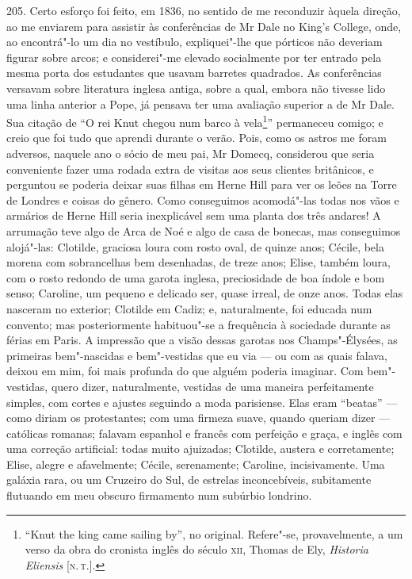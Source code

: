 205. Certo esforço foi feito, em 1836, no sentido de me reconduzir
àquela direção, ao me enviarem para assistir às conferências de Mr Dale
no King's College, onde, ao encontrá"-lo um dia no vestíbulo,
expliquei"-lhe que pórticos não deveriam figurar sobre arcos; e
considerei"-me elevado socialmente por ter entrado pela mesma porta dos
estudantes que usavam barretes quadrados. As conferências versavam sobre
literatura inglesa antiga, sobre a qual, embora não tivesse lido uma
linha anterior a Pope, já pensava ter uma avaliação superior a de Mr
Dale. Sua citação de ``O rei Knut chegou num barco à vela\footnote{``Knut
  the king came sailing by'', no original. Refere"-se, provavelmente, a
  um verso da obra do cronista inglês do século \textsc{xii}, Thomas de Ely,
  \emph{Historia Eliensis} {[}\textsc{n.\,t.}{]}.}'' permaneceu comigo; e creio
que foi tudo que aprendi durante o verão. Pois, como os astros me foram
adversos, naquele ano o sócio de meu pai, Mr Domecq, considerou que
seria conveniente fazer uma rodada extra de visitas aos seus clientes
britânicos, e perguntou se poderia deixar suas filhas em Herne Hill para
ver os leões na Torre de Londres e coisas do gênero. Como conseguimos
acomodá"-las todas nos vãos e armários de Herne Hill seria inexplicável
sem uma planta dos três andares! A arrumação teve algo de Arca de Noé e
algo de casa de bonecas, mas conseguimos alojá"-las: Clotilde, graciosa
loura com rosto oval, de quinze anos; Cécile, bela morena com
sobrancelhas bem desenhadas, de treze anos; Elise, também loura, com o
rosto redondo de uma garota inglesa, preciosidade de boa índole e bom
senso; Caroline, um pequeno e delicado ser, quase irreal, de onze anos.
Todas elas nasceram no exterior; Clotilde em Cadiz; e, naturalmente, foi
educada num convento; mas posteriormente habituou"-se a frequência à
sociedade durante as férias em Paris. A impressão que a visão dessas
garotas nos Champs"-Élysées, as primeiras bem"-nascidas e bem"-vestidas que
eu via --- ou com as quais falava, deixou em mim, foi mais profunda do
que alguém poderia imaginar. Com bem"-vestidas, quero dizer,
naturalmente, vestidas de uma maneira perfeitamente simples, com cortes
e ajustes seguindo a moda parisiense. Elas eram ``beatas'' --- como
diriam os protestantes; com uma firmeza suave, quando queriam dizer ---
católicas romanas; falavam espanhol e francês com perfeição e graça, e
inglês com uma correção artificial: todas muito ajuizadas; Clotilde,
austera e corretamente; Elise, alegre e afavelmente; Cécile,
serenamente; Caroline, incisivamente. Uma galáxia rara, ou um Cruzeiro
do Sul, de estrelas inconcebíveis, subitamente flutuando em meu obscuro
firmamento num subúrbio londrino.


